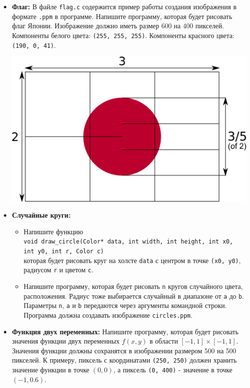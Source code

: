 \documentclass{article}
\begin{document}
\begin{itemize}
\item \textbf{Флаг:} В файле \texttt{flag.c} содержится пример работы создания изображения в формате \texttt{.ppm} в программе. Напишите программу, которая будет рисовать флаг Японии. Изображение должно иметь размер 600 на 400 пикселей. Компоненты белого цвета: \texttt{(255, 255, 255)}. Компоненты красного цвета: \texttt{(190, 0, 41)}.
\begin{center}
\includegraphics[scale=0.15]{../images/japanflag.png}
\end{center}
\item \textbf{Случайные круги:} 
\begin{itemize}
\item Напишите функцию \\
\texttt{void draw\_circle(Color* data, int width, int height, int x0, int y0, int r, Color c)}\\
которая будет рисовать круг на холсте \texttt{data} с центром в точке \texttt{(x0, y0)}, радиусом \texttt{r} и цветом \texttt{c}.
\item Напишите программу, которая будет рисовать \texttt{n} кругов случайного цвета, расположения. Радиус тоже выбирается случайный в диапазоне от \texttt{a} до \texttt{b}. Параметры \texttt{n}, \texttt{a} и \texttt{b} передаются через аргументы командной строки. Программа должна создавать изображение \texttt{circles.ppm}.
\end{itemize}
\item \textbf{Функция двух переменных:} Напишите программу, которая будет рисовать значения функции двух переменных $f(x, y)$ в области $[-1, 1]\times[-1, 1]$.\\
 Значения функции должны сохранятся в изображении размером 500 на 500 пикселей. К примеру, пиксель с координатами \texttt{(250, 250)} должен хранить значение функции в точке $(0, 0)$, а пиксель \texttt{(0, 400)} - значение в точке $(-1, 0.6)$. \\

\end{itemize}
\end{document}
